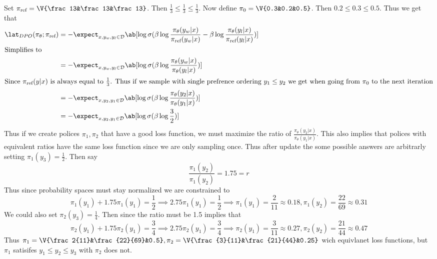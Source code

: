 \documentclass[12pt]{amsart}
\begin{document}
  \begin{problem}
    \begin{subproblem}
      Set $\pi_\text{ref}=\V{\frac13&\frac13&\frac13}$. Then $\frac13\leq \frac13\leq\frac13$. Now define $\pi_0 = \V{0.3&0.2&0.5}$. Then $0.2\leq0.3\leq0.5$. Thus we get that 
      \begin{align*}
        \lat_{DPO}(\pi_\theta;\pi_{\text{ref}}) &= -\expect_{x,y_w,y_l\in \mathcal{D}}\ab[\log\sigma(\beta\log\frac{\pi_\theta(y_w|x)}{\pi_{\text{ref}}(y_w|x)}-\beta\log\frac{\pi_\theta(y_l|x)}{\pi_{\text{ref}}(y_l|x)})] \\
        \intertext{Simplifies to }
                                                &= -\expect_{x,y_w,y_l\in \mathcal{D}}\ab[\log\sigma(\beta\log\frac{\pi_\theta(y_w|x)}{\pi_\theta(y_l|x)})] \\
                                                \intertext{Since $\pi_\text{ref}(y|x)$ is always equal to $\frac13$. Thus if we sample with single prefrence ordering $y_1\leq y_2$ we get when going from $\pi_0$ to the next iteration}
                                                &= -\expect_{x,y_2,y_1\in \mathcal{D}}\ab[\log\sigma(\beta\log\frac{\pi_\theta(y_2|x)}{\pi_\theta(y_1|x)})] \\
                                                &= -\expect_{x,y_2,y_1\in \mathcal{D}}\ab[\log\sigma(\beta\log\frac{3}{2})] \\
      \end{align*}
      Thus if we create polices $\pi_1, \pi_2$ that have a good loss function, we must maximize the ratio of $\frac{\pi_\theta(y_2|x)}{\pi_\theta(y_1|x)}$. This also implies that polices with equivalent ratios have the same loss function since we are only sampling once. Thus after update the some possible answers are arbitrarly setting $\pi_1(y_3)=\frac12$. Then say
      \[\frac{\pi_1(y_2)}{\pi_1(y_2)}=1.75=r\]
      Thus since probability spaces must stay normalized we are constrained to  
      \[\pi_1(y_1)+1.75\pi_1(y_1)=\frac12\implies 2.75\pi_1(y_1)=\frac12\implies\pi_1(y_1)=\frac2{11}\approx0.18, \pi_1(y_2)=\frac{22}{69}\approx0.31\]
      We could also set $\pi_2(y_3)=\frac14$. Then since the ratio must be 1.5 implies that 
      \[\pi_2(y_1)+1.75\pi_2(y_1)=\frac34\implies  2.75\pi_2(y_1)=\frac34\implies\pi_2(y_1)=\frac{3}{11}\approx0.27, \pi_2(y_2)=\frac{21}{44}\approx0.47\]
      Thus $\pi_1=\V{\frac2{11}&\frac{22}{69}&0.5}, \pi_2=\V{\frac{3}{11}&\frac{21}{44}&0.25}$ wich equivlanet loss functions, but $\pi_1$ satisifes $y_1\leq y_2\leq y_3$ with $\pi_2$ does not.

\end{subproblem}
\end{problem}
\end{document}
